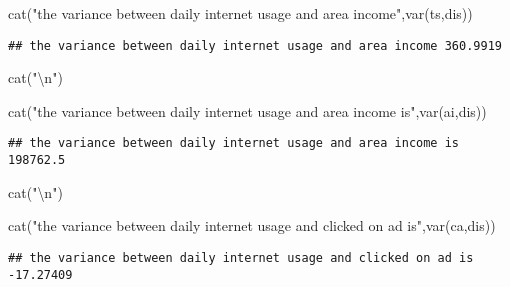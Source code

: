 \documentclass[
]{article}
\newenvironment{Shaded}{\begin{snugshade}}{\end{snugshade}}
\newcommand{\FunctionTok}[1]{\textcolor[rgb]{0.00,0.00,0.00}{#1}}
\newcommand{\NormalTok}[1]{#1}
\newcommand{\SpecialCharTok}[1]{\textcolor[rgb]{0.00,0.00,0.00}{#1}}
\newcommand{\StringTok}[1]{\textcolor[rgb]{0.31,0.60,0.02}{#1}}
\begin{document}
\begin{Shaded}
\begin{Highlighting}[]
\FunctionTok{cat}\NormalTok{(}\StringTok{"the variance between daily internet usage and area income"}\NormalTok{,}\FunctionTok{var}\NormalTok{(ts,dis))}
\end{Highlighting}
\end{Shaded}

\begin{verbatim}
## the variance between daily internet usage and area income 360.9919
\end{verbatim}

\begin{Shaded}
\begin{Highlighting}[]
\FunctionTok{cat}\NormalTok{(}\StringTok{"}\SpecialCharTok{\textbackslash{}n}\StringTok{"}\NormalTok{)}
\end{Highlighting}
\end{Shaded}

\begin{Shaded}
\begin{Highlighting}[]
\FunctionTok{cat}\NormalTok{(}\StringTok{"the variance between daily internet usage and area income is"}\NormalTok{,}\FunctionTok{var}\NormalTok{(ai,dis))}
\end{Highlighting}
\end{Shaded}

\begin{verbatim}
## the variance between daily internet usage and area income is 198762.5
\end{verbatim}

\begin{Shaded}
\begin{Highlighting}[]
\FunctionTok{cat}\NormalTok{(}\StringTok{"}\SpecialCharTok{\textbackslash{}n}\StringTok{"}\NormalTok{)}
\end{Highlighting}
\end{Shaded}

\begin{Shaded}
\begin{Highlighting}[]
\FunctionTok{cat}\NormalTok{(}\StringTok{"the variance between daily internet usage and clicked on ad is"}\NormalTok{,}\FunctionTok{var}\NormalTok{(ca,dis))}
\end{Highlighting}
\end{Shaded}

\begin{verbatim}
## the variance between daily internet usage and clicked on ad is -17.27409
\end{verbatim}
\end{document}
